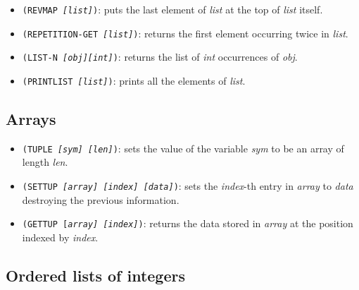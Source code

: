 \begin{itemize}
        {\tt (UNLIST (QUOTE (A))) $\Longrightarrow$ A}

        {\tt (UNLIST (QUOTE (A B))) $\Longrightarrow$ (A . B)}

        {\tt (UNLIST (QUOTE (A B C))) $\Longrightarrow$ (A B . C)}
    \item {\tt  (REVMAP {\it [list]})}:
        puts the last element of {\it list} at the top of
        {\it list} itself.
    \item {\tt  (REPETITION-GET {\it [list]})}:
         returns the first element occurring twice in {\it list}.
    \item {\tt  (LIST-N {\it [obj][int]})}:
         returns the list of {\it int} occurrences of {\it obj}.
    \item {\tt  (PRINTLIST {\it [list]})}:
         prints all the elements of {\it list}.
\end{itemize}


\subsection{Arrays}

\begin{itemize}
    \item {\tt (TUPLE {\em [sym]} {\em [len]})}:
        sets the value of the variable {\em sym} to be an array of length
        {\em len}. 
    \item {\tt (SETTUP {\em [array]} {\em [index]} {\em [data]})}:
        sets the {\em index}-th entry in {\em array} to {\em data} destroying
        the previous information.
    \item {\tt (GETTUP {[\em array]} {\em [index]})}:
        returns the data stored in {\em array} at the position indexed by
		{\em index}.
\end{itemize}


\subsection{Ordered lists of integers}

